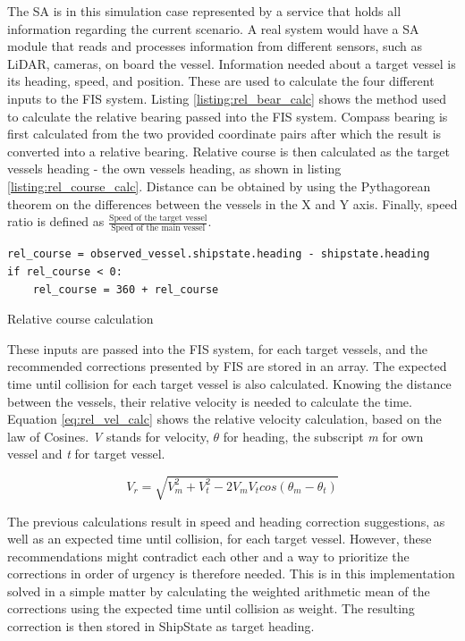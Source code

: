 The SA is in this simulation case represented by a service that holds all information regarding the current scenario. A real system would have a SA module that reads and processes information from different sensors, such as LiDAR, cameras, on board the vessel. Information needed about a target vessel is its heading, speed, and position. These are used to calculate the four different inputs to the FIS system. Listing \ref{listing:rel_bear_calc} shows the method used to calculate the relative bearing passed into the FIS system. Compass bearing is first calculated from the two provided coordinate pairs after which the result is converted into a relative bearing. Relative course is then calculated as the target vessels heading - the own vessels heading, as shown in listing \ref{listing:rel_course_calc}. Distance can be obtained by using the Pythagorean theorem on the differences between the vessels in the X and Y axis. Finally, speed ratio is defined as $\frac{\text{Speed of the target vessel}}{\text{Speed of the main vessel}}$.
\begin{listing}

    \begin{verbatim}
rel_course = observed_vessel.shipstate.heading - shipstate.heading
if rel_course < 0:
    rel_course = 360 + rel_course
    \end{verbatim}
    \caption{Relative course calculation}
    \label{listing:rel_course_calc}
\end{listing}

These inputs are passed into the FIS system, for each target vessels, and the recommended corrections presented by FIS are stored in an array. The expected time until collision for each target vessel is also calculated. Knowing the distance between the vessels, their relative velocity is needed to calculate the time. Equation \ref{eq:rel_vel_calc} shows the relative velocity calculation, based on the law of Cosines. \textit{V} stands for velocity, $\theta$ for heading, the subscript \textit{m} for own vessel and \textit{t} for target vessel.

\begin{equation}
    V_r=\sqrt{V_m^2 + V_t^2-2  V_mV_tcos(\theta_m-\theta_t)}
    \label{eq:rel_vel_calc}
\end{equation}

The previous calculations result in speed and heading correction suggestions, as well as an expected time until collision, for each target vessel. However, these recommendations might contradict each other and a way to prioritize the corrections in order of urgency is therefore needed. This is in this implementation solved in a simple matter by calculating the weighted arithmetic mean of the corrections using the expected time until collision as weight. The resulting correction is then stored in ShipState as target heading.

